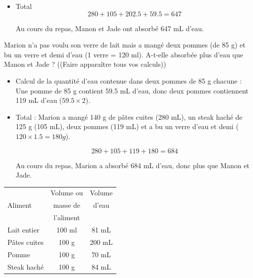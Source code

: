 \documentclass[a4paper,11pt]{exam}
\begin{document}
\begin{questions}
\begin{solution}
\begin{itemize}
			\item Total
			\begin{equation*}
				280 + 105 + \num{202.5} + \num{59.5} = 647
			\end{equation*}
			
			Au cours du repas, Manon et Jade ont absorbé 647 mL d'eau.
		\end{itemize}
	
	\end{solution}
	
	\question Marion n'a pas voulu son verre de lait mais a mangé deux pommes (de 85 g) et bu un verre et demi d'eau (1 verre = 120 ml). A-t-elle absorbée plus d'eau que Manon et Jade ? ((Faire apparaître tous vos calculs))
	
	\begin{solution}
		\begin{itemize}
			\item Calcul de la quantité d'eau contenue dans deux pommes de 85 g chacune :
			Une pomme de 85 g contient \num{59.5} mL d'eau, donc deux pommes contiennent 119 mL d'eau ($\num{59.5} \times 2$).
			
			
			\item Total :
			Marion a mangé 140 g de pâtes cuites (280 mL), un steak haché de 125 g (105 mL), deux pommes (119 mL) et a bu un verre d'eau et demi ($120 \times \num{1.5} = 180 g$).
			
			\begin{equation*}
				280 + 105 + 119 + 180 = 684
			\end{equation*}
			
			Au cours du repas, Marion a absorbé 684 mL d'eau, donc plus que Manon et Jade.
		\end{itemize}
	\end{solution}
\end{questions}

\begin{center}
	\begin{tabular}{|l|c|c|}
		\hline
		& Volume ou & Volume \\ 
		Aliment      & masse de  & d'eau  \\ 
		& l'aliment &        \\ \hline
		Lait entier  & 100 ml    & 81 mL  \\ \hline
		Pâtes cuites & 100 g     & 200 mL \\ \hline
		Pomme        & 100 g     & 70 mL  \\ \hline
		Steak haché  & 100 g     & 84 mL  \\ \hline
	\end{tabular}
\end{center}
\end{document}
